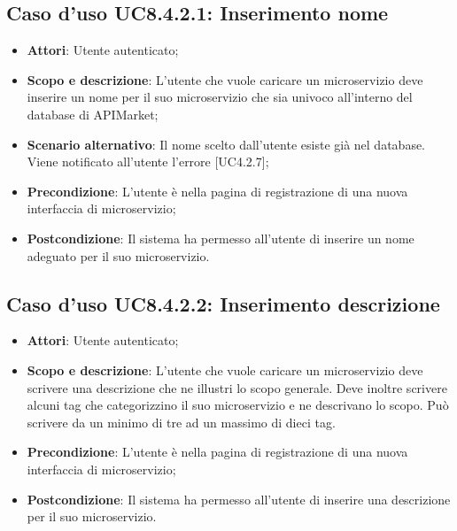 \documentclass[12pt,a4paper,titlepage]{article}
\begin{document}
	\subsection{Caso d'uso UC8.4.2.1: Inserimento nome}
	\label{UC8.4.2.1}
	\begin{itemize}
		\item \textbf{Attori}: Utente autenticato;
		\item \textbf{Scopo e descrizione}: L'utente che vuole caricare un microservizio deve inserire un nome per il suo microservizio che sia univoco all'interno del database di APIMarket;
		\item \textbf{Scenario alternativo}: Il nome scelto dall'utente esiste già nel database. Viene notificato all'utente l'errore [UC4.2.7];
		\item \textbf{Precondizione}: L'utente è nella pagina di registrazione di una nuova interfaccia di microservizio;
		\item \textbf{Postcondizione}: Il sistema ha permesso all'utente di inserire un nome adeguato per il suo microservizio.
	\end{itemize}
	\subsection{Caso d'uso UC8.4.2.2: Inserimento descrizione}
	\label{UC8.4.2.2}
	\begin{itemize}
		\item \textbf{Attori}: Utente autenticato;
		\item \textbf{Scopo e descrizione}: L'utente che vuole caricare un microservizio deve scrivere una descrizione che ne illustri lo scopo generale. Deve inoltre scrivere alcuni tag che categorizzino il suo microservizio e ne descrivano lo scopo. Può scrivere da un minimo di tre ad un massimo di dieci tag.
		\item \textbf{Precondizione}: L'utente è nella pagina di registrazione di una nuova interfaccia di microservizio;
		\item \textbf{Postcondizione}: Il sistema ha permesso all'utente di inserire una descrizione per il suo microservizio.
	\end{itemize}
\end{document}
